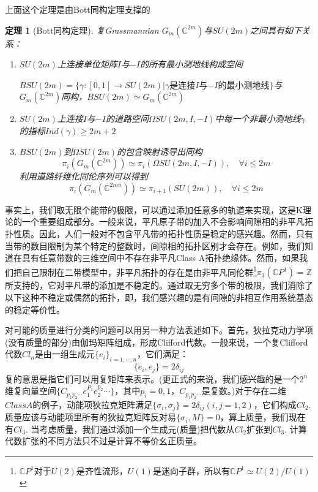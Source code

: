 \documentclass[a4paper]{article}
\numberwithin{equation}{subsection}
\newtheorem{theorem}{定理}
\begin{document}
上面这个定理是由Bott同构定理支撑的
\begin{theorem}[Bott同构定理]
    复Grassmannian $G_m(\mathbb{C}^{2m})$与$SU(2m)$之间具有如下关系：
    \begin{enumerate}
        \item $SU(2m)$上连接单位矩阵$I$与$-I$的所有最小测地线构成空间
        
        $BSU(2m)=\{\gamma:[0,1]\rightarrow SU(2m)|\gamma\text{是连接$I$与$-I$的最小测地线}\}$与$G_m(\mathbb{C}^{2m})$同构，$BSU(2m)\simeq G_m(\mathbb{C}^{2m})$
        \item $SU(2m)$上连接$I$与$-I$的道路空间$\Omega SU(2m,I,-I)$中每一个非最小测地线$\gamma$的指标$Ind(\gamma)\geq 2m+2$
        \item $BSU(2m)$到$\Omega SU(2m)$的包含映射诱导出同构
        \begin{equation}
            \pi_i(G_m(\mathbb{C}^{2m}))\simeq \pi_i(\Omega SU(2m,I,-I)),\quad \forall i\leq 2m
        \end{equation}
        利用道路纤维化同伦序列可以得到
        \begin{equation}
            \pi_i(G_m(\mathbb{C}^{2mn}))\simeq \pi_{i+1}(SU(2m)),\quad \forall i\leq 2m
        \end{equation}
    \end{enumerate}
\end{theorem}

事实上，我们取无限个能带的极限，可以通过添加任意多的轨道来实现，这是K理论的一个重要组成部分。一般来说，平凡原子带的加入不会影响间隙相的非平凡拓扑性质。因此，人们一般对不包含平凡带的拓扑性质是稳定的感兴趣。然而，只有当带的数目限制为某个特定的整数时，间隙相的拓扑区别才会存在。例如，我们知道在具有任意带数的三维空间中不存在非平凡Class A拓扑绝缘体。然而，如果我们把自己限制在二带模型中，非平凡拓扑的存在是由非平凡同伦群\footnote{$\mathbb{C}P^1$对于$U(2)$是齐性流形，$U(1)$是迷向子群，所以有$\mathbb{C}P^1\simeq U(2)/U(1)$}$\pi_3(\mathbb{C}P^1)=\mathbb{Z}$所支持的，它对平凡带的添加是不稳定的。通过取无穷多个带的极限，我们消除了以下这种不稳定或偶然的拓扑，即，我们感兴趣的是有间隙的非相互作用系统基态的稳定等价性。

对可能的质量进行分类的问题可以用另一种方法表述如下。首先，狄拉克动力学项(没有质量的部分)由伽玛矩阵组成，形成Clifford代数。一般来说，一个复Clifford代数$Cl_n$是由一组生成元$\{e_i\}_{i=1,\cdots,n}$，它们满足：
\begin{equation}
    \{e_i,e_j\}=2\delta_{ij}
\end{equation}
复的意思是指它们可以用复矩阵来表示。(更正式的来说，我们感兴趣的是一个$2^n$维复向量空间$\{C_{p_1p_2\cdots}e_1^{P_1}e_2^{p_2}\cdots\}$，其中$p_i=0,1$，$C_{p_1p_2\cdots}$是复数。)对于存在二维$Class A$的例子，动能项狄拉克矩阵满足$\{\sigma_i,\sigma_j\}=2\delta_{ij}(i,j=1,2)$，它们构成$Cl_2$. 质量应该与动能项里所有的狄拉克矩阵反对易$\{\sigma_i,M\}=0$，算上质量，我们现在有$Cl_3$. 当考虑质量，我们通过添加一个生成元(质量)把代数从$Cl_2$扩张到$Cl_3$. 计算代数扩张的不同方法只不过是计算不等价幺正质量。
\end{document}

